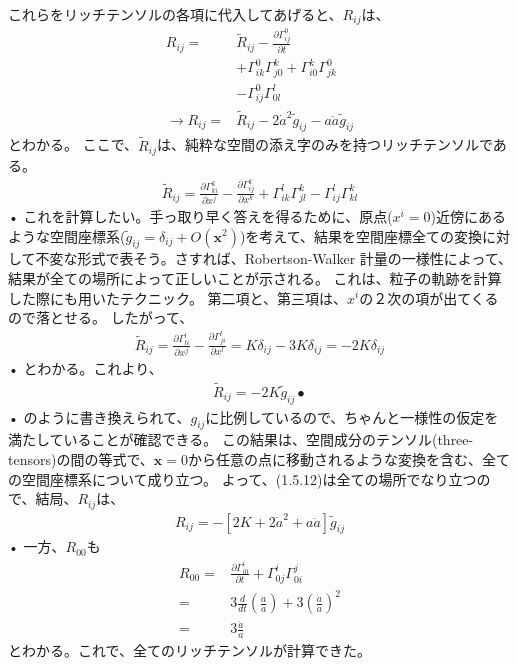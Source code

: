 \documentclass[11pt,a4paper,dvipdfmx]{jsarticle}
\theoremstyle{plain}
\theoremstyle{break}
\newcommand{\tilg}{\tilde{g}}
\begin{document}
これらをリッチテンソルの各項に代入してあげると、$R_{ij}$は、
\begin{align}
  R_{ij} =&\tilde{R}_{ij}
  -\frac{\partial \Gamma_{i j}^{0}}{\partial t}\\
  &+\Gamma_{i k}^{0} \Gamma_{j 0}^{k}+\Gamma_{i 0}^{k} \Gamma_{j k}^{0} \\
  &-\Gamma_{i j}^{0} \Gamma_{0 l}^{l} \\
\rightarrow
  R_{ij} =&\tilde{R}_{ij} - 2 \dot{a}^2 \tilg_{ij} - a \ddot{a} \tilg_{ij}
\end{align}
とわかる。
ここで、$\tilde{R}_{ij}$は、純粋な空間の添え字のみを持つリッチテンソルである。
\begin{align}
\tilde{R}_{i j}=\frac{\partial \Gamma_{k i}^{k}}{\partial x^{j}}-\frac{\partial \Gamma_{i j}^{k}}{\partial x^{k}}+\Gamma_{i k}^{l} \Gamma_{j l}^{k}-\Gamma_{i j}^{l} \Gamma_{k l}^{k}
\end{align}•%
これを計算したい。手っ取り早く答えを得るために、原点($x^i =0$)近傍にあるような空間座標系($\tilg_{ij} = \delta_{ij} + O(\mathbf{x}^2)$)を考えて、結果を空間座標全ての変換に対して不変な形式で表そう。さすれば、Robertson-Walker 計量の一様性によって、結果が全ての場所によって正しいことが示される。
これは、粒子の軌跡を計算した際にも用いたテクニック。
第二項と、第三項は、$x^i$の２次の項が出てくるので落とせる。
したがって、
\begin{align}
  \tilde{R}_{i j}=\frac{\partial \Gamma_{l i}^{l}}{\partial x^{j}}-\frac{\partial \Gamma_{j i}^{l}}{\partial x^{l}}=K \delta_{i j}-3 K \delta_{i j}=-2 K \delta_{i j}
 \end{align}•%
とわかる。これより、
\begin{align}
 \tilde{R}_{i j}=-2 K \tilde{g}_{i j}•
\end{align}•%
のように書き換えられて、$g_{ij}$に比例しているので、ちゃんと一様性の仮定を満たしていることが確認できる。
この結果は、空間成分のテンソル(three-tensors)の間の等式で、$\mathbf{x} = 0$から任意の点に移動されるような変換を含む、全ての空間座標系について成り立つ。
よって、(1.5.12)は全ての場所でなり立つので、結局、$R_{ij}$は、
\begin{align}
 R_{i j}=-\left[2 K+2 \dot{a}^{2}+a \ddot{a}\right] \tilde{g}_{i j}
\end{align}•%
一方、$R_{00}$も
\begin{align}
  R_{00}
  =& \frac{\partial \Gamma_{i 0}^{i}}{\partial t}+\Gamma_{0 j}^{i} \Gamma_{0 i}^{j} \\
  =&3 \frac{d}{d t}\left(\frac{\dot{a}}{a}\right)+3\left(\frac{\dot{a}}{a}\right)^{2} \\
  =& 3 \frac{\ddot{a}}{a}
\end{align}
とわかる。これで、全てのリッチテンソルが計算できた。
\end{document}
